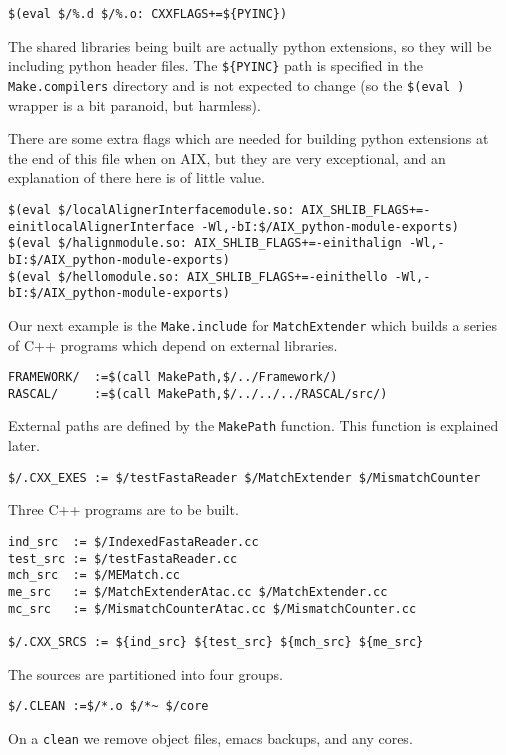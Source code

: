 \documentclass[letterpaper]{article}
\begin{document}
\begin{verbatim}
$(eval $/%.d $/%.o: CXXFLAGS+=${PYINC})
\end{verbatim}
The shared libraries being built are actually python extensions, so they
will be including python header files.  The \verb+${PYINC}+ path is
specified in the \verb+Make.compilers+ directory and is not expected to
change (so the \verb+$(eval )+ wrapper is a bit paranoid, but harmless).

There are some extra flags which are needed for building python
extensions at the end of this file when on AIX, but they are very
exceptional, and an explanation of there here is of little value.
\begin{verbatim}
$(eval $/localAlignerInterfacemodule.so: AIX_SHLIB_FLAGS+=-einitlocalAlignerInterface -Wl,-bI:$/AIX_python-module-exports)
$(eval $/halignmodule.so: AIX_SHLIB_FLAGS+=-einithalign -Wl,-bI:$/AIX_python-module-exports)
$(eval $/hellomodule.so: AIX_SHLIB_FLAGS+=-einithello -Wl,-bI:$/AIX_python-module-exports)
\end{verbatim}

Our next example is the \verb+Make.include+ for
\verb+MatchExtender+ which builds a series of C++ programs which
depend on external libraries.

\begin{verbatim}
FRAMEWORK/  :=$(call MakePath,$/../Framework/)
RASCAL/     :=$(call MakePath,$/../../../RASCAL/src/)
\end{verbatim}
External paths are defined by the \verb+MakePath+ function.  This
function is explained later.

\begin{verbatim}
$/.CXX_EXES := $/testFastaReader $/MatchExtender $/MismatchCounter
\end{verbatim}
Three C++ programs are to be built.

\begin{verbatim}
ind_src  := $/IndexedFastaReader.cc
test_src := $/testFastaReader.cc
mch_src  := $/MEMatch.cc
me_src   := $/MatchExtenderAtac.cc $/MatchExtender.cc
mc_src   := $/MismatchCounterAtac.cc $/MismatchCounter.cc

$/.CXX_SRCS := ${ind_src} ${test_src} ${mch_src} ${me_src}
\end{verbatim}
The sources are partitioned into four groups.

\begin{verbatim}
$/.CLEAN :=$/*.o $/*~ $/core
\end{verbatim}
On a \verb+clean+ we remove object files, emacs backups, and any cores.
\end{document}
